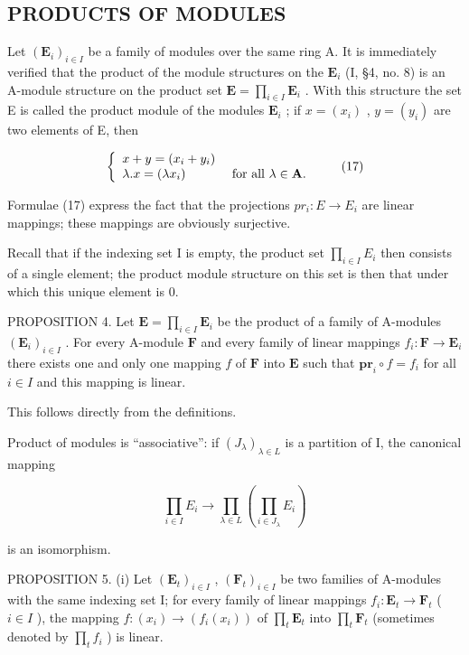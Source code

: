 \subsection{PRODUCTS OF MODULES}

Let \((\mathbf{E}_i)_{i\in I}\) be a family of modules over the same ring A. It is immediately verified that the product of the module structures on the \(\mathbf{E}_i\) (I, §4, no. 8) is an A-module structure on the product set \(\mathbf{E} = \prod_{i\in I}\mathbf{E}_i\) . With this structure the set E is called the product module of the modules \(\mathbf{E}_i\) ; if \(x = (x_i)\) , \(y = (y_i)\) are two elements of E, then

\[
\left\{ \begin{array}{l l} x + y = (x _ {i} + y _ {i}) \\ \lambda . x = (\lambda x _ {i}) & \text { for   all } \lambda \in \mathbf {A}. \end{array} \right.\tag{17}
\]

Formulae (17) express the fact that the projections \(pr_{i}:E\to E_{i}\) are linear mappings; these mappings are obviously surjective.

Recall that if the indexing set I is empty, the product set \(\prod_{i\in I}E_{i}\) then consists of a single element; the product module structure on this set is then that under which this unique element is 0.

PROPOSITION 4. Let \(\mathbf{E} = \prod_{i\in I}\mathbf{E}_i\) be the product of a family of A-modules \((\mathbf{E}_i)_{i\in I}\) . For every A-module \(\mathbf{F}\) and every family of linear mappings \(f_i:\mathbf{F}\to \mathbf{E}_i\) there exists one and only one mapping \(f\) of \(\mathbf{F}\) into \(\mathbf{E}\) such that \(\mathbf{pr}_i\circ f = f_i\) for all \(i\in I\) and this mapping is linear.

This follows directly from the definitions.

Product of modules is ``associative'': if \((J_{\lambda})_{\lambda \in L}\) is a partition of I, the canonical mapping

\[
\prod_ {i \in I} E _ {i} \rightarrow \prod_ {\lambda \in L} \left(\prod_ {i \in J _ {\lambda}} E _ {i}\right)
\]

is an isomorphism.

PROPOSITION 5. (i) Let \((\mathbf{E}_t)_{i \in I}\) , \((\mathbf{F}_t)_{i \in I}\) be two families of A-modules with the same indexing set I; for every family of linear mappings \(f_i: \mathbf{E}_t \to \mathbf{F}_t\) ( \(i \in I\) ), the mapping \(f: (x_i) \to (f_i(x_i))\) of \(\prod_t \mathbf{E}_t\) into \(\prod_t \mathbf{F}_t\) (sometimes denoted by \(\prod_t f_i\) ) is linear.

